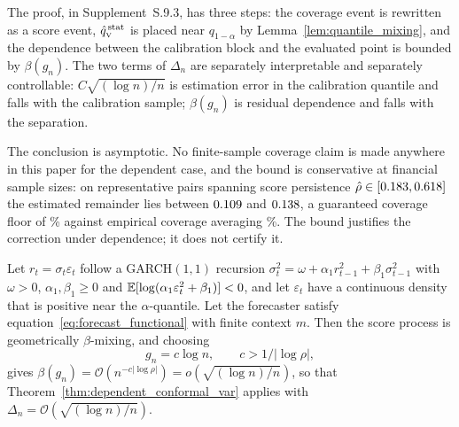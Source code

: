 The proof, in Supplement~S.9.3, has three steps: the coverage event is rewritten
as a score event, $\hat{q}_{\scriptscriptstyle\mathrm{V}}^{\,\mathrm{stat}}$ is placed near $q_{1-\alpha}$ by
Lemma~\ref{lem:quantile_mixing}, and the dependence between the calibration block
and the evaluated point is bounded by $\beta(g_n)$. The two terms of $\Delta_n$
are separately interpretable and separately controllable: $C\sqrt{(\log n)/n}$ is
estimation error in the calibration quantile and falls with the calibration
sample; $\beta(g_n)$ is residual dependence and falls with the separation.

The conclusion is asymptotic. No finite-sample coverage claim is made anywhere in
this paper for the dependent case, and the bound is conservative at financial
sample sizes: on \nBoundPairs{} representative pairs spanning score persistence
$\hat\rho\in[0.183,0.618]$ the estimated remainder lies between
$0.109$ and $0.138$, a guaranteed coverage floor of
\nBoundFloor\% against empirical coverage averaging \nBoundEmpirical\%. The bound justifies the
correction under dependence; it does not certify it.

\begin{corollary}
	\label{cor:garch}
	Let $r_t = \sigma_t\varepsilon_t$ follow a GARCH$(1,1)$ recursion
	$\sigma_t^2 = \omega + \alpha_1 r_{t-1}^2 + \beta_1\sigma_{t-1}^2$ with
	$\omega>0$, $\alpha_1,\beta_1\ge 0$ and
	$\mathbb{E}[\log(\alpha_1\varepsilon_t^2+\beta_1)]<0$, and let $\varepsilon_t$ have a
	continuous density that is positive near the $\alpha$-quantile. Let the
	forecaster satisfy equation~\eqref{eq:forecast_functional} with finite
	context $m$. Then the score process is geometrically $\beta$-mixing, and
	choosing
	\begin{equation}
		\label{eq:garch_gap_rate}
		g_n = c\log n,
		\qquad
		c > 1/\lvert\log\rho\rvert,
	\end{equation}
	gives $\beta(g_n) = \mathcal O(n^{-c\lvert\log\rho\rvert}) = o\!\left(\sqrt{(\log n)/n}\right)$,
	so that Theorem~\ref{thm:dependent_conformal_var} applies with
	$\Delta_n = \mathcal O\!\left(\sqrt{(\log n)/n}\right)$.
\end{corollary}

